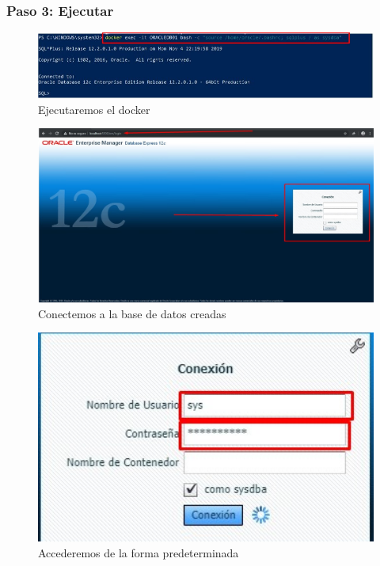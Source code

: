 \documentclass[preprint,12pt]{elsarticle}
\begin{document}
\subsubsection{\textbf{Paso 3: Ejecutar}}
\begin{figure}[H]
	\begin{center}
		\includegraphics[width=12cm]{./IMAGENES/foto12} 
		\caption{Ejecutaremos el docker}
	\end{center}
\end{figure}

\begin{figure}[H]
	\begin{center}
		\includegraphics[width=12cm]{./IMAGENES/foto13} 
		\caption{Conectemos a la base de datos creadas}
	\end{center}
\end{figure}

\begin{figure}[H]
	\begin{center}
		\includegraphics[width=12cm]{./IMAGENES/foto14} 
		\caption{Accederemos de la forma predeterminada}
	\end{center}
\end{figure}
\end{document}
